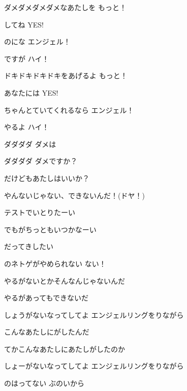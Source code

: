 \documentclass[a4paper,tate,twocolumn,12pt]{ltjtarticle}
\begin{document}
\begin{flushleft}
\begin{minipage}{\linewidth}
ダメダメダメダメなあたしを もっと！

してね YES!

のにな エンジェル！

ですが ハイ！

ドキドキドキドキをあげるよ もっと！

あなたには YES!

ちゃんとていてくれるなら エンジェル！

やるよ ハイ！

ダダダダ ダメは

ダダダダ ダメですか？

だけどもあたしはいいか？

やんないじゃない、できないんだ！(ドヤ！)
\end{minipage}

\vspace{2em}

\noindent\begin{minipage}{\linewidth}
テストでいとりたーい

でもがちっともいつかなーい

だってきしたい

のネトゲがやめられない ない！
\end{minipage}

\vspace{2em}

\noindent\begin{minipage}{\linewidth}
やるがないとかそんなんじゃないんだ

やるがあってもできないだ

しょうがないなってしてよ エンジェルリングをりながら

こんなあたしにがしたんだ

てかこんなあたしにあたしがしたのか

しょーがないなってしてよ エンジェルリングをりながら
\end{minipage}

\vspace{2em}

\noindent\begin{minipage}{\linewidth}
のはってない ぶのいから


\end{minipage}
\end{flushleft}
\end{document}
